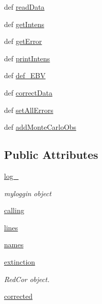 \begin{DoxyCompactItemize}
\item 
def \hyperlink{classpyneb_1_1core_1_1pynebcore_1_1_observation_a47ca1f35468a585901b8e5d726d10aa1}{read\-Data}
\item 
def \hyperlink{classpyneb_1_1core_1_1pynebcore_1_1_observation_aa802bda219ff354ea1392e4b197fad1d}{get\-Intens}
\item 
def \hyperlink{classpyneb_1_1core_1_1pynebcore_1_1_observation_afa728d7fca929fe4e891f31746749777}{get\-Error}
\item 
def \hyperlink{classpyneb_1_1core_1_1pynebcore_1_1_observation_aa29e53677935b79960b6bdc74fef04ee}{print\-Intens}
\item 
def \hyperlink{classpyneb_1_1core_1_1pynebcore_1_1_observation_a63b6d1eeb5f04c67822fa786ba0df0a2}{def\-\_\-\-E\-B\-V}
\item 
def \hyperlink{classpyneb_1_1core_1_1pynebcore_1_1_observation_a8e31aa077dfbd7c1265fd9f1c0aa48e2}{correct\-Data}
\item 
def \hyperlink{classpyneb_1_1core_1_1pynebcore_1_1_observation_aec854dfb4fa1ec4fc0e4529edf97ef02}{set\-All\-Errors}
\item 
def \hyperlink{classpyneb_1_1core_1_1pynebcore_1_1_observation_a72b195b630dd91ce62c2fa324e2ceb66}{add\-Monte\-Carlo\-Obs}
\end{DoxyCompactItemize}
\subsection*{Public Attributes}
\begin{DoxyCompactItemize}
\item 
\hyperlink{classpyneb_1_1core_1_1pynebcore_1_1_observation_afd87151907f32bc0dc45f0171b61374e}{log\-\_\-}
\begin{DoxyCompactList}\small\item\em myloggin object \end{DoxyCompactList}\item 
\hyperlink{classpyneb_1_1core_1_1pynebcore_1_1_observation_ab25fa7ebe84b603684dee62410c1e34c}{calling}
\item 
\hyperlink{classpyneb_1_1core_1_1pynebcore_1_1_observation_a22ea78f101680108434cb132f12afa0a}{lines}
\item 
\hyperlink{classpyneb_1_1core_1_1pynebcore_1_1_observation_a7d9df0b08f5a808d295f7a8335151070}{names}
\item 
\hyperlink{classpyneb_1_1core_1_1pynebcore_1_1_observation_a1f0d047efde58dcd55d16811d0221f43}{extinction}
\begin{DoxyCompactList}\small\item\em Red\-Cor object. \end{DoxyCompactList}\item 
\hyperlink{classpyneb_1_1core_1_1pynebcore_1_1_observation_a439dda562826dd28b863fff170a5beb3}{corrected}
\end{DoxyCompactItemize}


